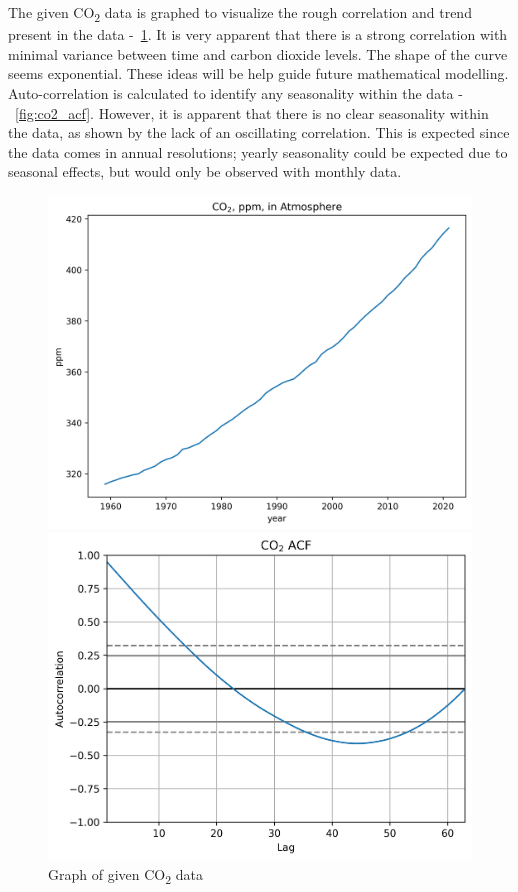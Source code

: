 \documentclass[12pt]{mcmthesis}
\begin{document}
    The given CO\textsubscript{2} data is graphed to visualize the rough correlation and trend present in the data -~\ref{fig:co2}. It is very apparent that there is a strong correlation with minimal variance between time and carbon dioxide levels. The shape of the curve seems exponential. These ideas will be help guide future mathematical modelling.
    Auto-correlation is calculated to identify any seasonality within the data -~\ref{fig:co2_acf}. However, it is apparent that there is no clear seasonality within the data, as shown by the lack of an oscillating correlation. This is expected since the data comes in annual resolutions; yearly seasonality could be expected due to seasonal effects, but would only be observed with monthly data.

    \begin{figure}[h]
        \centering
        \begin{minipage}{.5\textwidth}
            \centering
            \includegraphics[width=\textwidth]{co2}%
            \caption{Graph of given CO\textsubscript{2} data}
            \label{fig:co2}
        \end{minipage}%
        \begin{minipage}{.5\textwidth}
            \centering
            \includegraphics[width=\textwidth]{co2_acf}%

\end{minipage}
\end{figure}
\end{document}
